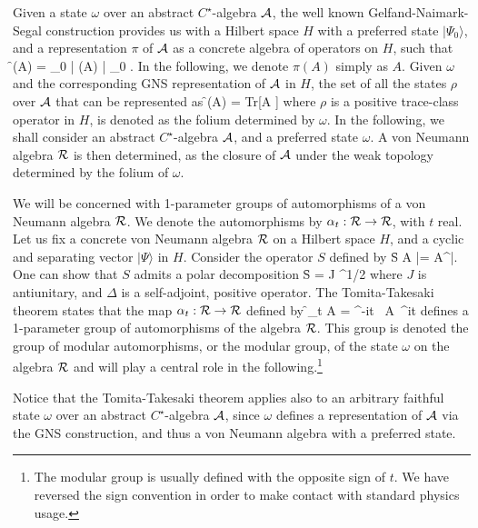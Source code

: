 Given a state $\omega$ over an abstract $C^\star$-algebra $\cal
A$, the well known Gelfand-Naimark-Segal construction provides
us with a Hilbert space $H$ with a preferred state $|\Psi_0\rangle$,
and a representation $\pi$ of $\cal A$ as a concrete algebra of
operators on $H$, such that
\f
	\omega(A) = \langle \Psi_0 | \pi(A) | \Psi_0 \rangle.
\ff
In the following, we denote $\pi(A)$ simply as $A$.  Given
$\omega$ and the corresponding GNS representation of
$\cal A$ in $H$, the set of all the states $\rho$ over $\cal A$
that can be represented as
\f
			\rho(A) = Tr[A \rho ]
\ff
where $\rho$ is a positive trace-class operator in $H$, is denoted
as the folium determined by $\omega$.    In the
following,  we shall consider an abstract $C^\star$-algebra $\cal
A$, and a preferred state $\omega$.  A von Neumann algebra $\cal
R$ is then determined, as the closure of $\cal A$ under the weak
topology determined by the folium of $\omega$.

We will be concerned with 1-parameter groups of automorphisms
of a von Neumann algebra $\cal R$. We denote the automorphisms
by $\alpha_t: {\cal R} \rightarrow {\cal R}$, with $t$ real.   Let
us fix a concrete von Neumann algebra $\cal R$ on a Hilbert space
$H$, and a cyclic and separating vector $|\Psi\rangle$ in $H$.
Consider the operator $S$
defined by
\f
	S A |\Psi\rangle = A^\star |\Psi\rangle.    \label{S}
\ff
One can show that $S$ admits a polar decomposition
\f
	S = J \Delta^{1/2}					\label{s}
\ff
where $J$ is antiunitary, and $\Delta$ is a self-adjoint, positive
operator.  The Tomita-Takesaki theorem \cite{tt} states that the
map $\alpha_t: {\cal R} \rightarrow {\cal R}$ defined by
\f
	\alpha_t A =  \Delta^{-it} \ A\   \Delta^{it}
	\label{tomita}
\ff
defines a 1-parameter group of automorphisms of the algebra
$\cal R$.  This group is denoted the group of modular
automorphisms, or the modular group, of the state $\omega$ on
the algebra $\cal R$ and
will play a central role in the following.\footnote{The modular
group is usually defined with the opposite sign of $t$. We have
reversed the sign convention in order to make contact with
standard physics usage.}

Notice that the  Tomita-Takesaki theorem applies also to an
arbitrary faithful state $\omega$ over an abstract
$C^\star$-algebra $\cal
A$, since $\omega$ defines a representation of $\cal A$ via
the GNS construction, and thus a von Neumann algebra with a
preferred state.

